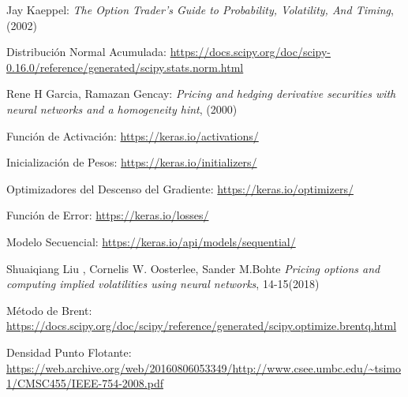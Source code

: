 \documentclass[a4paper,openright, 12pt, oneside]{book}
\begin{document}
\begin{thebibliography}{X}
  Jay Kaeppel:
  \emph{The Option Trader’s Guide to Probability, Volatility, And Timing},
  (2002)

  Distribución Normal Acumulada:
  \url{https://docs.scipy.org/doc/scipy-0.16.0/reference/generated/scipy.stats.norm.html}

  Rene H Garcia, Ramazan Gencay:
  \emph{Pricing and hedging derivative securities with neural networks and a homogeneity hint},
  (2000)

  Función de Activación:
  \url{https://keras.io/activations/}

  Inicialización de Pesos:
  \url{https://keras.io/initializers/}

  Optimizadores del Descenso del Gradiente:
  \url{https://keras.io/optimizers/}

  Función de Error:
  \url{https://keras.io/losses/}

  Modelo Secuencial:
  \url{https://keras.io/api/models/sequential/}

  Shuaiqiang Liu , Cornelis W. Oosterlee, Sander M.Bohte
  \emph{Pricing options and computing implied volatilities using neural networks},
  14-15(2018)

  Método de Brent:
  \url{https://docs.scipy.org/doc/scipy/reference/generated/scipy.optimize.brentq.html}

  Densidad Punto Flotante:
  \url{https://web.archive.org/web/20160806053349/http://www.csee.umbc.edu/~tsimo1/CMSC455/IEEE-754-2008.pdf}

\end{thebibliography}



%
%

\end{document}
